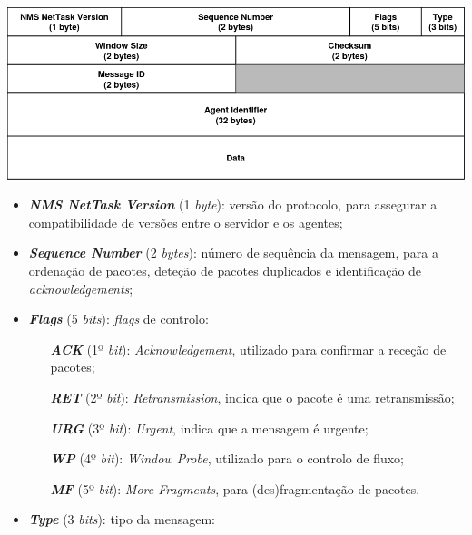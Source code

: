 \documentclass[a4paper,12pt]{scrreprt}
\begin{document}
\begin{minipage}{\textwidth}
    \centering
    \includegraphics[width=\textwidth]{img/nettask_header.png}
    \label{fig:nettask_message_format}
\end{minipage}

\begin{itemize}
    \item \textbf{\textit{NMS NetTask Version}} (1 \textit{byte}):  versão do protocolo,
        para assegurar a compatibilidade de versões entre o servidor e os agentes;
    \item \textbf{\textit{Sequence Number}}     (2 \textit{bytes}): número de sequência da mensagem,
        para a ordenação de pacotes, deteção de pacotes duplicados e identificação de \textit{acknowledgements};
    \item \textbf{\textit{Flags}}               (5 \textit{bits}):  \textit{flags} de controlo:
        \begin{itemize}
           \item [\textbf{\textit{ACK}}] (1º \textit{bit}): \textit{Acknowledgement}, utilizado para confirmar a receção de pacotes;
           \item [\textbf{\textit{RET}}] (2º \textit{bit}): \textit{Retransmission}, indica que o pacote é uma retransmissão;
           \item [\textbf{\textit{URG}}] (3º \textit{bit}): \textit{Urgent}, indica que a mensagem é urgente;
           \item [\textbf{\textit{WP}} ] (4º \textit{bit}): \textit{Window Probe}, utilizado para o controlo de fluxo;
           \item [\textbf{\textit{MF}} ] (5º \textit{bit}): \textit{More Fragments}, para (des)fragmentação de pacotes.
        \end{itemize}
    \item \textbf{\textit{Type}}                (3 \textit{bits}): tipo da mensagem:
        \begin{itemize}

\end{itemize}
\end{itemize}
\end{document}
